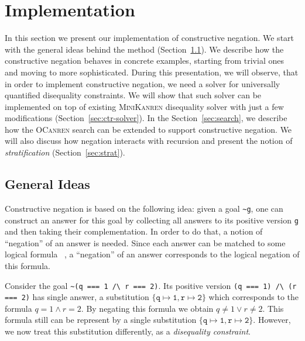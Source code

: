 \section{Implementation}

\label{sec:implementation}

In this section we present our implementation of constructive negation.
We start with the general ideas behind the method (Section~\ref{sec:negation}).
We describe how the constructive negation behaves
in concrete examples, starting from trivial ones
and moving to more sophisticated.
During this presentation, we will observe, 
that in order to implement constructive negation, 
we need a solver for universally quantified disequality constraints.
We will show that such solver can be implemented 
on top of existing \textsc{MiniKanren} disequality solver
with just a few modifications (Section~\ref{sec:ctr-solver}).
In the Section~\ref{sec:search}, 
we describe how the \textsc{OCanren} search can be extended
to support constructive negation.
We will also discuss how negation interacts with recursion
and present the notion of \emph{stratification} (Section~\ref{sec:strat}). 

\subsection{General Ideas}

\label{sec:negation}

Constructive negation is based on the following idea: 
given a goal \lstinline{~g}, one can construct an answer for this goal 
by collecting all answers to its positive version \lstinline{g} 
and then taking their complementation.
In order to do that, a notion of ``negation'' of an answer is needed.
Since each answer can be matched to some logical formula~
\cite{przymusinski1989constructive, stuckey1991constructive}, 
a ``negation'' of an answer corresponds to the logical negation of
this formula. 

\begin{example}
  \label{ex:disequality}
  Consider the goal \lstinline{~(q === 1 /\ r === 2)}.
  Its positive version \lstinline{(q === 1) /\ (r === 2)} 
  has single answer, a substitution 
  $\mathtt{\{q \mapsto 1, r \mapsto 2 \}}$
  which corresponds to the formula $q = 1 \wedge r = 2$.
  By negating this formula we obtain $q \neq 1 \vee r \neq 2$.
  This formula still can be represent by a single substitution
  $\mathtt{\{q \mapsto 1, r \mapsto 2 \}}$.
  However, we now treat this substitution differently, as a \emph{disequality constraint}. 
\end{example}

